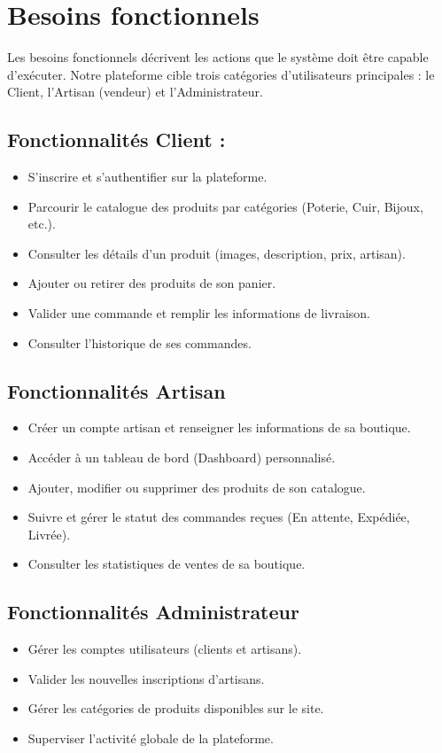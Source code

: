 \documentclass[12pt,a4paper]{report}
\begin{document}
\section{Besoins fonctionnels}
Les besoins fonctionnels décrivent les actions que le système doit être capable d'exécuter. Notre plateforme cible trois catégories d'utilisateurs principales : le Client, l'Artisan (vendeur) et l'Administrateur.

\subsection{Fonctionnalités Client :}
\begin{itemize}
    \item S'inscrire et s'authentifier sur la plateforme.
    \item Parcourir le catalogue des produits par catégories (Poterie, Cuir, Bijoux, etc.).
    \item Consulter les détails d'un produit (images, description, prix, artisan).
    \item Ajouter ou retirer des produits de son panier.
    \item Valider une commande et remplir les informations de livraison.
    \item Consulter l'historique de ses commandes.
\end{itemize}

\subsection{Fonctionnalités Artisan}
\begin{itemize}
    \item Créer un compte artisan et renseigner les informations de sa boutique.
    \item Accéder à un tableau de bord (Dashboard) personnalisé.
    \item Ajouter, modifier ou supprimer des produits de son catalogue.
    \item Suivre et gérer le statut des commandes reçues (En attente, Expédiée, Livrée).
    \item Consulter les statistiques de ventes de sa boutique.
\end{itemize}

\subsection{Fonctionnalités Administrateur}
\begin{itemize}
    \item Gérer les comptes utilisateurs (clients et artisans).
    \item Valider les nouvelles inscriptions d'artisans.
    \item Gérer les catégories de produits disponibles sur le site.
    \item Superviser l'activité globale de la plateforme.
\end{itemize}
\end{document}

